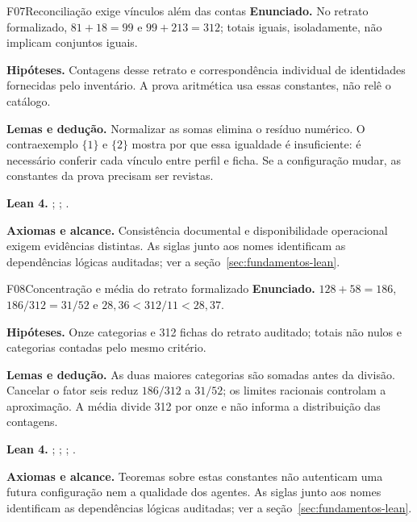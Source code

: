 \begin{formalizacao}{F07}{Reconciliação exige vínculos além das contas}
\textbf{Enunciado.} No retrato formalizado, $81+18=99$ e $99+213=312$; totais iguais, isoladamente, não implicam conjuntos iguais.

\textbf{Hipóteses.} Contagens desse retrato e correspondência individual de identidades fornecidas pelo inventário. A prova aritmética usa essas constantes, não relê o catálogo.

\textbf{Lemas e dedução.} Normalizar as somas elimina o resíduo numérico. O contraexemplo $\{1\}$ e $\{2\}$ mostra por que essa igualdade é insuficiente: é necessário conferir cada vínculo entre perfil e ficha. Se a configuração mudar, as constantes da prova precisam ser revistas.

\textbf{Lean 4.} ; ; .

\textbf{Axiomas e alcance.} Consistência documental e disponibilidade operacional exigem evidências distintas. As siglas junto aos nomes identificam as dependências lógicas auditadas; ver a seção~\ref{sec:fundamentos-lean}.
\end{formalizacao}

\begin{formalizacao}{F08}{Concentração e média do retrato formalizado}
\textbf{Enunciado.} $128+58=186$, $186/312=31/52$ e $28{,}36<312/11<28{,}37$.

\textbf{Hipóteses.} Onze categorias e 312 fichas do retrato auditado; totais não nulos e categorias contadas pelo mesmo critério.

\textbf{Lemas e dedução.} As duas maiores categorias são somadas antes da divisão. Cancelar o fator seis reduz $186/312$ a $31/52$; os limites racionais controlam a aproximação. A média divide 312 por onze e não informa a distribuição das contagens.

\textbf{Lean 4.} ; ; ; .

\textbf{Axiomas e alcance.} Teoremas sobre estas constantes não autenticam uma futura configuração nem a qualidade dos agentes. As siglas junto aos nomes identificam as dependências lógicas auditadas; ver a seção~\ref{sec:fundamentos-lean}.
\end{formalizacao}

